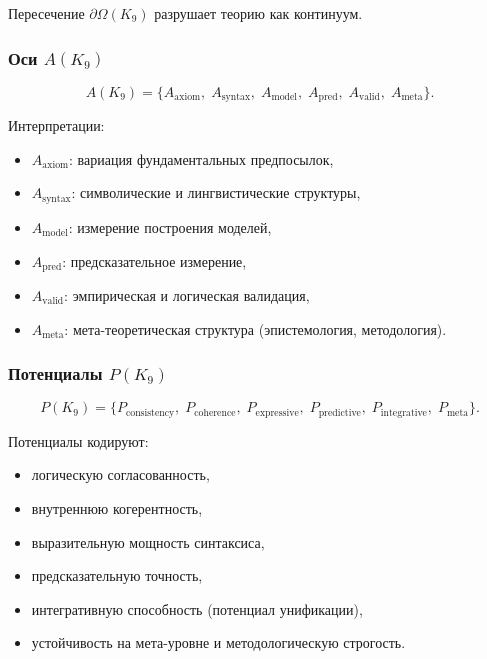 Пересечение $\partial\Omega(K_9)$ разрушает теорию как континуум.

\subsubsection{Оси \texorpdfstring{$A(K_9)$}{A(K_9)}}

\[
A(K_9)=
\{
A_{\mathrm{axiom}},\;
A_{\mathrm{syntax}},\;
A_{\mathrm{model}},\;
A_{\mathrm{pred}},\;
A_{\mathrm{valid}},\;
A_{\mathrm{meta}}
\}.
\]

Интерпретации:
\begin{itemize}
    \item $A_{\mathrm{axiom}}$: вариация фундаментальных предпосылок,
    \item $A_{\mathrm{syntax}}$: символические и лингвистические структуры,
    \item $A_{\mathrm{model}}$: измерение построения моделей,
    \item $A_{\mathrm{pred}}$: предсказательное измерение,
    \item $A_{\mathrm{valid}}$: эмпирическая и логическая валидация,
    \item $A_{\mathrm{meta}}$: мета-теоретическая структура (эпистемология, методология).
\end{itemize}

\subsubsection{Потенциалы \texorpdfstring{$P(K_9)$}{P(K_9)}}

\[
P(K_9)=
\{
P_{\mathrm{consistency}},\;
P_{\mathrm{coherence}},\;
P_{\mathrm{expressive}},\;
P_{\mathrm{predictive}},\;
P_{\mathrm{integrative}},\;
P_{\mathrm{meta}}
\}.
\]

Потенциалы кодируют:
\begin{itemize}
    \item логическую согласованность,
    \item внутреннюю когерентность,
    \item выразительную мощность синтаксиса,
    \item предсказательную точность,
    \item интегративную способность (потенциал унификации),
    \item устойчивость на мета-уровне и методологическую строгость.
\end{itemize}

